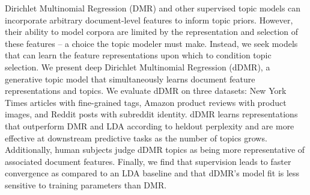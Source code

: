 Dirichlet Multinomial Regression (DMR) and other supervised topic models can incorporate arbitrary document-level features to inform topic priors.  However, their ability to model corpora are limited by the representation and selection of these  features -- a choice the topic modeler must make. Instead, we seek models that can learn the feature representations upon which to condition topic selection.  We present deep Dirichlet Multinomial Regression (dDMR), a generative topic model that simultaneously learns document feature representations  and topics. We evaluate dDMR on three datasets: New York Times articles with fine-grained tags, Amazon product reviews with product images, and Reddit posts with subreddit identity.  dDMR learns representations that outperform DMR and LDA according to heldout perplexity and are more effective at downstream predictive tasks as the number of topics grows. Additionally, human subjects judge dDMR topics as being more representative of associated document features.  Finally, we find that supervision leads to faster convergence as compared to an LDA baseline and that dDMR's model fit is less sensitive to training parameters than DMR.
